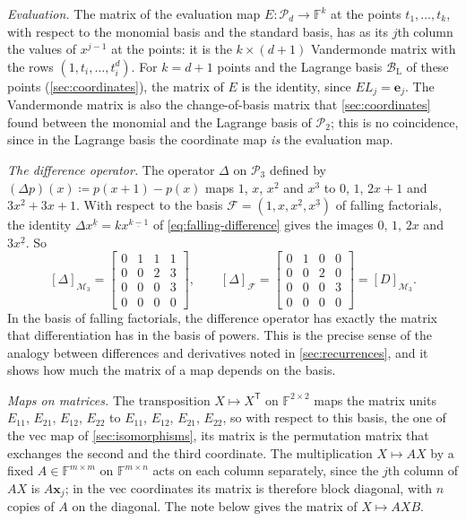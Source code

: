 \emph{Evaluation.} The matrix of the evaluation map $E\colon\mathcal P_d\to\mathbb F^k$ at the points $t_1,\ldots,t_k$, with respect to the monomial basis and the standard basis, has as its $j$th column the values of $x^{j-1}$ at the points: it is the $k\times(d+1)$ Vandermonde matrix with the rows $(1,t_i,\ldots,t_i^d)$. For $k=d+1$ points and the Lagrange basis $\mathcal B_{\mathrm L}$ of these points (\cref{sec:coordinates}), the matrix of $E$ is the identity, since $EL_j=\mathbf e_j$. The Vandermonde matrix is also the change-of-basis matrix that \cref{sec:coordinates} found between the monomial and the Lagrange basis of $\mathcal P_2$; this is no coincidence, since in the Lagrange basis the coordinate map \emph{is} the evaluation map.

\emph{The difference operator.} The operator $\Delta$ on $\mathcal P_3$ defined by $(\Delta p)(x)\coloneqq p(x+1)-p(x)$ maps $1$, $x$, $x^2$ and $x^3$ to $0$, $1$, $2x+1$ and $3x^2+3x+1$. With respect to the basis $\mathcal F=(1,x,x^{\underline2},x^{\underline3})$ of falling factorials, the identity $\Delta x^{\underline k}=kx^{\underline{k-1}}$ of \eqref{eq:falling-difference} gives the images $0$, $1$, $2x$ and $3x^{\underline2}$. So
\[
[\Delta]_{\mathcal M_3}=\begin{bmatrix}0&1&1&1\\0&0&2&3\\0&0&0&3\\0&0&0&0\end{bmatrix},\qquad
[\Delta]_{\mathcal F}=\begin{bmatrix}0&1&0&0\\0&0&2&0\\0&0&0&3\\0&0&0&0\end{bmatrix}=[D]_{\mathcal M_3}.
\]
In the basis of falling factorials, the difference operator has exactly the matrix that differentiation has in the basis of powers. This is the precise sense of the analogy between differences and derivatives noted in \cref{sec:recurrences}, and it shows how much the matrix of a map depends on the basis.

\emph{Maps on matrices.} The transposition $X\mapsto X^{\mathsf T}$ on $\mathbb F^{2\times2}$ maps the matrix units $E_{11}$, $E_{21}$, $E_{12}$, $E_{22}$ to $E_{11}$, $E_{12}$, $E_{21}$, $E_{22}$, so with respect to this basis, the one of the vec map of \cref{sec:isomorphisms}, its matrix is the permutation matrix that exchanges the second and the third coordinate. The multiplication $X\mapsto AX$ by a fixed $A\in\mathbb F^{m\times m}$ on $\mathbb F^{m\times n}$ acts on each column separately, since the $j$th column of $AX$ is $A\mathbf x_j$; in the vec coordinates its matrix is therefore block diagonal, with $n$ copies of $A$ on the diagonal. The note below gives the matrix of $X\mapsto AXB$.

